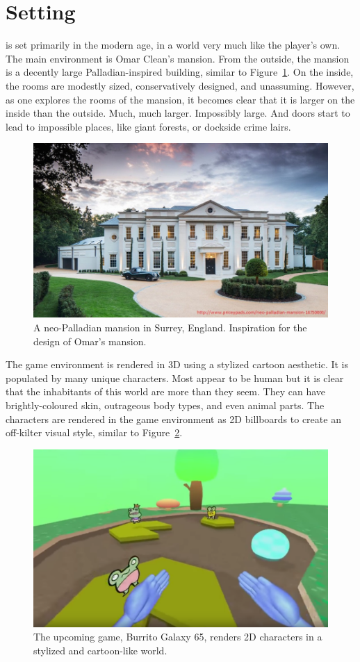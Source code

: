 \section{Setting}
\ourgame{} is set primarily in the modern age, in a world very much like the player's own. The main environment is Omar Clean's mansion. From the outside, the mansion is a decently large Palladian-inspired building, similar to Figure~\ref{fig:mansion_photo}. On the inside, the rooms are modestly sized, conservatively designed, and unassuming. However, as one explores the rooms of the mansion, it becomes clear that it is larger on the inside than the outside. Much, much larger. Impossibly large. And doors start to lead to impossible places, like giant forests, or dockside crime lairs.

\begin{figure}[htb]
\centering\includegraphics[width=.4\linewidth]{images/mansion}
\caption{A neo-Palladian mansion in Surrey, England. Inspiration for the design of Omar's mansion.}
\label{fig:mansion_photo}
\end{figure}

The game environment is rendered in 3D using a stylized cartoon aesthetic. It is populated by many unique characters. Most appear to be human but it is clear that the inhabitants of this world are more than they seem. They can have brightly-coloured skin, outrageous body types, and even animal parts. The characters are rendered in the game environment as 2D billboards to create an off-kilter visual style, similar to Figure~\ref{fig:burrito_galaxy}.

\begin{figure}[htb]
\centering\includegraphics[width=.4\linewidth]{images/burrito}
\caption{The upcoming game, Burrito Galaxy 65, renders 2D characters in a stylized and cartoon-like world.}
\label{fig:burrito_galaxy}
\end{figure}

